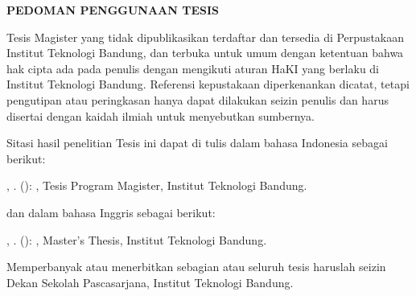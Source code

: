 \clearpage
{}
\begin{center}
  \textbf{\large \MakeUppercase{Pedoman Penggunaan Tesis}} \\[2em]
\end{center}

Tesis Magister yang tidak dipublikasikan terdaftar dan tersedia di Perpustakaan Institut Teknologi Bandung, dan terbuka untuk umum dengan ketentuan bahwa hak cipta ada pada penulis dengan mengikuti aturan HaKI yang berlaku di Institut Teknologi Bandung. Referensi kepustakaan diperkenankan dicatat, tetapi pengutipan atau peringkasan hanya dapat dilakukan seizin penulis dan harus disertai dengan kaidah ilmiah untuk menyebutkan sumbernya.

Sitasi hasil penelitian Tesis ini dapat di tulis dalam bahasa Indonesia sebagai berikut:

\begin{hangparas}{0.5in}{1}
    \AuthorLastName, \AuthorFirstName. (\ThesisYear): \emph{\Title}, Tesis Program Magister, Institut Teknologi Bandung.
\end{hangparas}

dan dalam bahasa Inggris sebagai berikut:\\

\begin{hangparas}{0.5in}{1}
    \AuthorLastName, \AuthorFirstName. (\ThesisYear): \emph{\TitleEnglish}, Master's Thesis, Institut Teknologi Bandung.
\end{hangparas}

Memperbanyak atau menerbitkan sebagian atau seluruh tesis haruslah seizin Dekan Sekolah Pascasarjana, Institut Teknologi Bandung.
